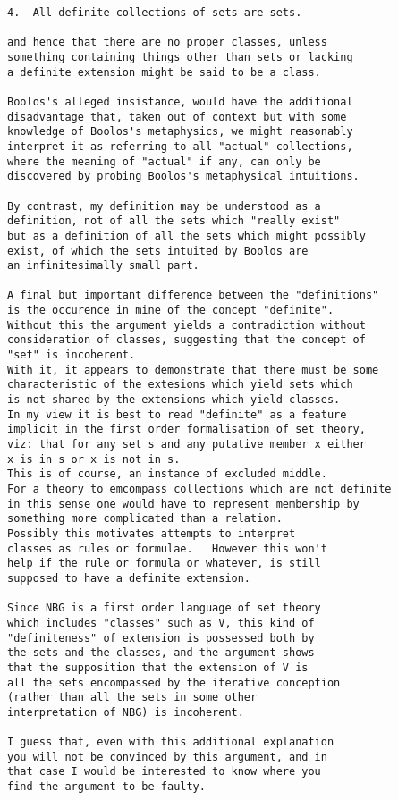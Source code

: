 \documentclass[numreferences]{rbjk}
\begin{document}
\begin{article}
\begin{verbatim}
4.  All definite collections of sets are sets.

and hence that there are no proper classes, unless
something containing things other than sets or lacking
a definite extension might be said to be a class.

Boolos's alleged insistance, would have the additional
disadvantage that, taken out of context but with some
knowledge of Boolos's metaphysics, we might reasonably
interpret it as referring to all "actual" collections,
where the meaning of "actual" if any, can only be
discovered by probing Boolos's metaphysical intuitions.

By contrast, my definition may be understood as a
definition, not of all the sets which "really exist"
but as a definition of all the sets which might possibly
exist, of which the sets intuited by Boolos are
an infinitesimally small part.

A final but important difference between the "definitions"
is the occurence in mine of the concept "definite".
Without this the argument yields a contradiction without
consideration of classes, suggesting that the concept of
"set" is incoherent.
With it, it appears to demonstrate that there must be some
characteristic of the extesions which yield sets which
is not shared by the extensions which yield classes.
In my view it is best to read "definite" as a feature
implicit in the first order formalisation of set theory,
viz: that for any set s and any putative member x either
x is in s or x is not in s.
This is of course, an instance of excluded middle.
For a theory to emcompass collections which are not definite
in this sense one would have to represent membership by
something more complicated than a relation.
Possibly this motivates attempts to interpret
classes as rules or formulae.   However this won't
help if the rule or formula or whatever, is still
supposed to have a definite extension.

Since NBG is a first order language of set theory
which includes "classes" such as V, this kind of
"definiteness" of extension is possessed both by
the sets and the classes, and the argument shows
that the supposition that the extension of V is
all the sets encompassed by the iterative conception
(rather than all the sets in some other
interpretation of NBG) is incoherent.

I guess that, even with this additional explanation
you will not be convinced by this argument, and in
that case I would be interested to know where you
find the argument to be faulty.


\end{verbatim}
\end{article}
\end{document}
